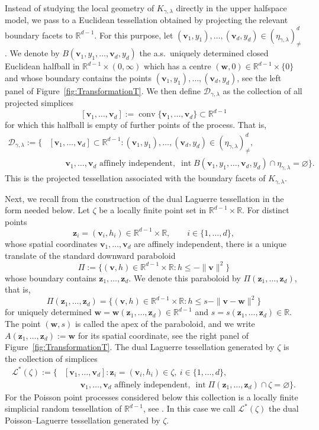 \documentclass[11pt,a4paper]{article}
\theoremstyle{plain}
\theoremstyle{definition}
\theoremstyle{remark}
\newcommand{\bz}{\boldsymbol{z}}
\newcommand{\bv}{\boldsymbol{v}}
\newcommand{\bw}{\boldsymbol{w}}
\def\RR{\mathbb{R}}
\def\cD{\mathcal{D}}
\newcommand{\conv}{\mathop{\mathrm{conv}}\nolimits}
\begin{document}
Instead of studying the local geometry of $K_{\gamma,\lambda}$ directly in
the upper halfspace model, we pass to a Euclidean tessellation obtained by
projecting the relevant boundary facets to $\RR^{d-1}$. For this purpose, let $(\bv_1,y_1),\ldots,(\bv_d,y_d)\in(\eta_{\gamma,\lambda})_{\neq}^d$. We denote by $B(\bv_1,y_1,\ldots,\bv_d,y_d)$ the a.s.\ uniquely determined closed Euclidean halfball in
$\RR^{d-1}\times(0,\infty)$ which has a centre $(\bw,0)\in \RR^{d-1}\times \{0\}$ and whose boundary contains the points
$(\bv_1,y_1),\ldots,(\bv_d,y_d)$, see the left panel of Figure~\ref{fig:TransformationT}. We then define
$\cD_{\gamma,\lambda}$ as the collection of all projected simplices
\[
	[\bv_1,\ldots,\bv_d]:=\conv\{\bv_1,\ldots,\bv_d\}\subset\RR^{d-1}
\]
for which this halfball is empty of further points of the process. That is,
\begin{align*}
	\cD_{\gamma,\lambda}
	:=
	\Big\{
	 & [\bv_1,\ldots,\bv_d]\subset\RR^{d-1}:
	(\bv_1,y_1),\ldots,(\bv_d,y_d)\in
	(\eta_{\gamma,\lambda})_{\neq}^d,                          \\
	 & \qquad \bv_1,\ldots,\bv_d \text{ affinely independent},
	\;\operatorname{int}B(\bv_1,y_1,\ldots,\bv_d,y_d)
	\cap\eta_{\gamma,\lambda}
	=
	\varnothing
	\Big\}.
\end{align*}
This is the projected tessellation associated with the boundary facets of
$K_{\gamma,\lambda}$.

Next, we recall from \cite[Section~3.1.4]{GiWL} the construction of the
dual Laguerre tessellation in the form needed below. Let $\zeta$ be a
locally finite point set in $\RR^{d-1}\times\RR$. For distinct points
\[
	\bz_i=(\bv_i,h_i)\in \RR^{d-1}\times\RR,
	\qquad i\in\{1,\ldots,d\},
\]
whose spatial coordinates $\bv_1,\ldots,\bv_d$ are affinely independent, there
is a unique translate of the standard downward paraboloid
\[
	\Pi:=\{(\bv,h)\in\RR^{d-1}\times\RR:h\le -\|\bv\|^2\}
\]
whose boundary contains $\bz_1,\ldots,\bz_d$. We denote this paraboloid by
$\Pi(\bz_1,\ldots,\bz_d)$, that is,
\[
	\Pi(\bz_1,\ldots,\bz_d)
	=
	\{(\bv,h)\in\RR^{d-1}\times\RR:
	h\le s-\|\bv-\bw\|^2\}
\]
for uniquely determined $\bw=\bw(\bz_1,\dotsc,\bz_d)\in\RR^{d-1}$ and $s=s(\bz_1,\dotsc,\bz_d)\in\RR$. The point
$(\bw,s)$ is called the apex of the paraboloid, and we write $A(\bz_1,\ldots,\bz_d):=\bw$
for its spatial coordinate, see the right panel of Figure~\ref{fig:TransformationT}.
The dual Laguerre tessellation generated by $\zeta$ is the collection of
simplices
\begin{align*}
	\mathcal L^*(\zeta)
	:=
	\Big\{
	 & [\bv_1,\ldots,\bv_d]:
	\bz_i=(\bv_i,h_i)\in\zeta,\ i\in\{1,\ldots,d\},\\
	 & \qquad \bv_1,\ldots,\bv_d \text{ affinely independent},
	\ \operatorname{int}\Pi(\bz_1,\ldots,\bz_d)\cap\zeta=\varnothing
	\Big\}.
\end{align*}
For the Poisson point processes
considered below this collection is a locally finite simplicial random
tessellation of $\RR^{d-1}$, see \cite[Section~3.1.4]{GiWL}. In this case
we call $\mathcal L^*(\zeta)$ the dual Poisson--Laguerre tessellation
generated by $\zeta$.
\end{document}
